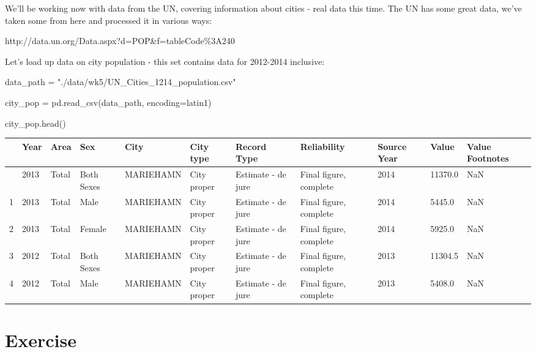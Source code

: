\documentclass[
  letterpaper,
  DIV=11,
  numbers=noendperiod]{scrreprt}
\newenvironment{Shaded}{\begin{snugshade}}{\end{snugshade}}
\newcommand{\NormalTok}[1]{\textcolor[rgb]{0.00,0.23,0.31}{#1}}
\newcommand{\OperatorTok}[1]{\textcolor[rgb]{0.37,0.37,0.37}{#1}}
\newcommand{\StringTok}[1]{\textcolor[rgb]{0.13,0.47,0.30}{#1}}
\begin{document}
We'll be working now with data from the UN, covering information about
cities - real data this time. The UN has some great data, we've taken
some from here and processed it in various ways:

http://data.un.org/Data.aspx?d=POP\&f=tableCode\%3A240

Let's load up data on city population - this set contains data for
2012-2014 inclusive:

\begin{Shaded}
\begin{Highlighting}[]
\NormalTok{data\_path }\OperatorTok{=} \StringTok{"./data/wk5/UN\_Cities\_1214\_population.csv"}

\NormalTok{city\_pop }\OperatorTok{=}\NormalTok{ pd.read\_csv(data\_path, encoding}\OperatorTok{=}\StringTok{\textquotesingle{}latin1\textquotesingle{}}\NormalTok{)}
\end{Highlighting}
\end{Shaded}

\begin{Shaded}
\begin{Highlighting}[]
\NormalTok{city\_pop.head()}
\end{Highlighting}
\end{Shaded}

\begin{longtable}[]{@{}lllllllllll@{}}
\toprule\noalign{}
& Year & Area & Sex & City & City type & Record Type & Reliability &
Source Year & Value & Value Footnotes \\
\midrule\noalign{}
\endhead
\bottomrule\noalign{}
\endlastfoot
0 & 2013 & Total & Both Sexes & MARIEHAMN & City proper & Estimate - de
jure & Final figure, complete & 2014 & 11370.0 & NaN \\
1 & 2013 & Total & Male & MARIEHAMN & City proper & Estimate - de jure &
Final figure, complete & 2014 & 5445.0 & NaN \\
2 & 2013 & Total & Female & MARIEHAMN & City proper & Estimate - de jure
& Final figure, complete & 2014 & 5925.0 & NaN \\
3 & 2012 & Total & Both Sexes & MARIEHAMN & City proper & Estimate - de
jure & Final figure, complete & 2013 & 11304.5 & NaN \\
4 & 2012 & Total & Male & MARIEHAMN & City proper & Estimate - de jure &
Final figure, complete & 2013 & 5408.0 & NaN \\
\end{longtable}

\hypertarget{exercise-19}{%
\section{Exercise}\label{exercise-19}}
\end{document}
